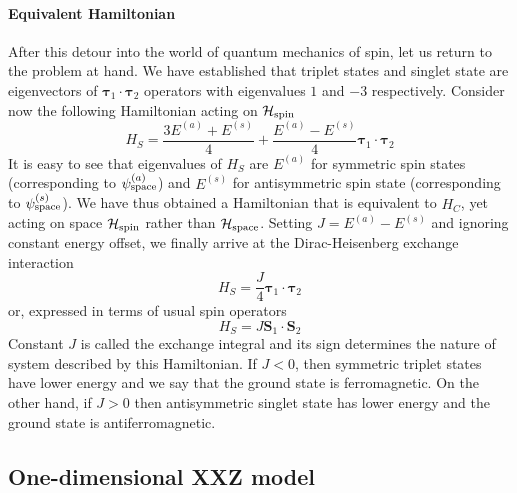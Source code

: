 \paragraph{Equivalent Hamiltonian}After this detour into the world of quantum mechanics of spin, let us return to the problem
at hand. We have established that triplet states and singlet state are eigenvectors of 
\(\bm{\tau}_1 \cdot \bm{\tau}_2\) operators with eigenvalues \(1\) and \(-3\) respectively.
Consider now the following Hamiltonian acting on \(\mathcal{H}_{\textrm{spin}}\)
\begin{equation}
    H_S = \frac{3 E^{(a)} + E^{(s)}}{4} + \frac{E^{(a)} - E^{(s)}}{4} \bm{\tau}_1 \cdot \bm{\tau}_2
    \label{eq:Coulomb recasted}
\end{equation}
It is easy to see that eigenvalues of \(H_S\) are \(E^{(a)}\) for symmetric spin states
(corresponding to \(\psi_{\textrm{space}}^{(a)}\)) and \(E^{(s)}\) for antisymmetric spin state (corresponding to \(\psi_{\textrm{space}}^{(s)}\)).
We have thus obtained a Hamiltonian that is equivalent to \(H_C\), yet acting on space 
\(\mathcal{H}_{\textrm{spin}}\) rather than \(\mathcal{H}_{\textrm{space}}\). Setting \(J = E^{(a)} - E^{(s)}\) and ignoring
constant energy offset, we finally arrive at the Dirac-Heisenberg exchange interaction
\begin{equation}
    H_S = \frac{J}{4} \bm{\tau}_1 \cdot \bm{\tau}_2
\end{equation}
or, expressed in terms of usual spin operators
\begin{equation}
    H_S = J \bm{S}_1 \cdot \bm{S}_2
    \label{eq:heisenberg dirac}
\end{equation}
Constant \(J\) is called the exchange integral and its sign determines the nature of system described
by this Hamiltonian. If \(J<0\), then symmetric triplet states have lower energy and we say that
the ground state is ferromagnetic. On the other hand, if \(J>0\) then antisymmetric singlet
state has lower energy and the ground state is antiferromagnetic.  

\subsection{One-dimensional XXZ model}
